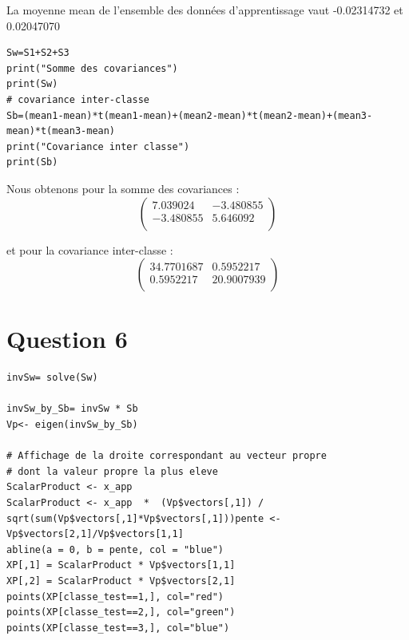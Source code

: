 \documentclass[a4paper,12pt]{report}
\begin{document}
La moyenne mean de l’ensemble des données d’apprentissage vaut -0.02314732 et 0.02047070


\begin{lstlisting}
Sw=S1+S2+S3
print("Somme des covariances")
print(Sw)
# covariance inter-classe
Sb=(mean1-mean)*t(mean1-mean)+(mean2-mean)*t(mean2-mean)+(mean3-mean)*t(mean3-mean)
print("Covariance inter classe")
print(Sb)
\end{lstlisting}

Nous obtenons pour la somme des covariances :
\[
   \left (
   \begin{array}{cc}
       7.039024 & -3.480855	\\
      -3.480855 & 5.646092 \\
   \end{array}
   \right )
\]

et pour la covariance inter-classe :
\[
   \left (
   \begin{array}{cc}
       34.7701687 & 0.5952217	\\
      	0.5952217 &  20.9007939\\
   \end{array}
   \right )
\]

\newpage

\section*{Question 6}

\begin{lstlisting}
invSw= solve(Sw)

invSw_by_Sb= invSw * Sb
Vp<- eigen(invSw_by_Sb)

# Affichage de la droite correspondant au vecteur propre
# dont la valeur propre la plus eleve
ScalarProduct <- x_app
ScalarProduct <- x_app  *  (Vp$vectors[,1]) / sqrt(sum(Vp$vectors[,1]*Vp$vectors[,1]))pente <- Vp$vectors[2,1]/Vp$vectors[1,1]
abline(a = 0, b = pente, col = "blue")
XP[,1] = ScalarProduct * Vp$vectors[1,1]
XP[,2] = ScalarProduct * Vp$vectors[2,1]
points(XP[classe_test==1,], col="red")
points(XP[classe_test==2,], col="green")
points(XP[classe_test==3,], col="blue")
\end{lstlisting}
\end{document}
